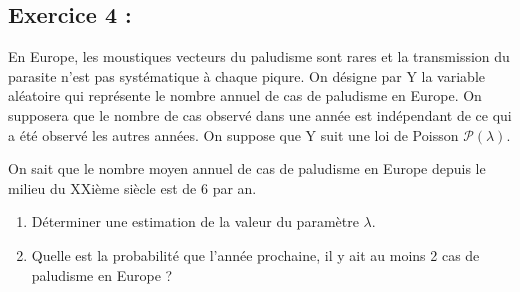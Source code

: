 \documentclass[11pt]{article}
\numberwithin{equation}{section}
\begin{document}
\bigskip


\subsection*{Exercice 4 : }
En Europe, les moustiques vecteurs du paludisme sont rares et la transmission du 
parasite n’est pas systématique à chaque piqure. 
On désigne par Y la variable aléatoire qui
représente le nombre annuel de cas de paludisme en Europe. On supposera que le
nombre de cas observé dans une année est indépendant de ce qui a été observé les autres
années. On suppose que Y suit une loi de Poisson $\mathcal{P}(\lambda)$.

On sait que le nombre moyen annuel de cas de paludisme
en Europe depuis le milieu du XXième siècle est de 6 par an. 
\begin{enumerate}
\item Déterminer une estimation de la valeur du paramètre $\lambda$.
\item Quelle est la probabilité que l’année prochaine, il y ait au moins 2 cas de paludisme en
Europe ?
\end{enumerate}
\end{document}
